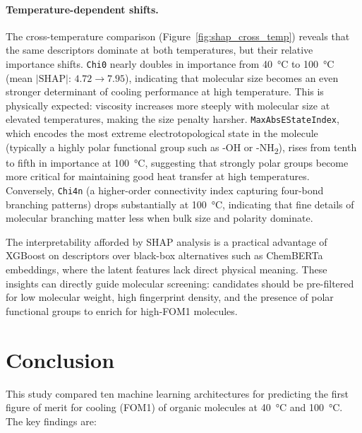 \documentclass[11pt,a4paper]{article}
\begin{document}
\paragraph{Temperature-dependent shifts.}
The cross-temperature comparison (Figure~\ref{fig:shap_cross_temp}) reveals that the same descriptors dominate at both temperatures, but their relative importance shifts. \texttt{Chi0} nearly doubles in importance from \SI{40}{\degreeCelsius} to \SI{100}{\degreeCelsius} (mean $|\text{SHAP}|$: $4.72 \rightarrow 7.95$), indicating that molecular size becomes an even stronger determinant of cooling performance at high temperature. This is physically expected: viscosity increases more steeply with molecular size at elevated temperatures, making the size penalty harsher. \texttt{MaxAbsEStateIndex}, which encodes the most extreme electrotopological state in the molecule (typically a highly polar functional group such as \textrm{-OH} or \textrm{-NH\textsubscript{2}}), rises from tenth to fifth in importance at \SI{100}{\degreeCelsius}, suggesting that strongly polar groups become more critical for maintaining good heat transfer at high temperatures. Conversely, \texttt{Chi4n} (a higher-order connectivity index capturing four-bond branching patterns) drops substantially at \SI{100}{\degreeCelsius}, indicating that fine details of molecular branching matter less when bulk size and polarity dominate.

The interpretability afforded by SHAP analysis is a practical advantage of XGBoost on descriptors over black-box alternatives such as ChemBERTa embeddings, where the latent features lack direct physical meaning. These insights can directly guide molecular screening: candidates should be pre-filtered for low molecular weight, high fingerprint density, and the presence of polar functional groups to enrich for high-FOM1 molecules.

\section{Conclusion}

This study compared ten machine learning architectures for predicting the first figure of merit for cooling (FOM1) of organic molecules at \SI{40}{\degreeCelsius} and \SI{100}{\degreeCelsius}. The key findings are:
\end{document}

